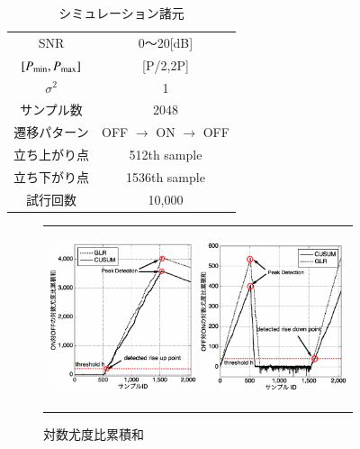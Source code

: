\documentclass[10pt, twocolumn, a4j]{jsarticle}
\begin{document}
\begin{table}[t]
\begin{center}
 \caption{シミュレーション諸元}
 \normalsize
  \begin{tabular}{c|c}\hline
    SNR & 0〜20[dB] \\
    $[P_{{\rm min}},P_{{\rm max}}]$ & [P/2,2P] \\
    $\sigma^2$ & 1 \\
    サンプル数 & 2048 \\
    遷移パターン & OFF $\rightarrow$ ON $\rightarrow$ OFF \\
    立ち上がり点 & 512th sample\\
    立ち下がり点 & 1536th sample\\
    試行回数 & 10,000 \\ \hline
  \end{tabular}
\label{parameter}
\end{center}
\end{table}
\begin{figure}[t]
		\begin{tabular}{c}
			\begin{minipage}{0.50\hsize}
				\includegraphics[clip,width=43mm,height=52mm]{OFF2ON.eps}
			\end{minipage}
			\begin{minipage}{0.20\hsize}
				\includegraphics[clip,width=43mm,height=52mm]{ON2OFF.eps}
			\end{minipage}
		\end{tabular}
                \caption{対数尤度比累積和}
                \label{Transition}

\end{figure}
		
\end{document}
